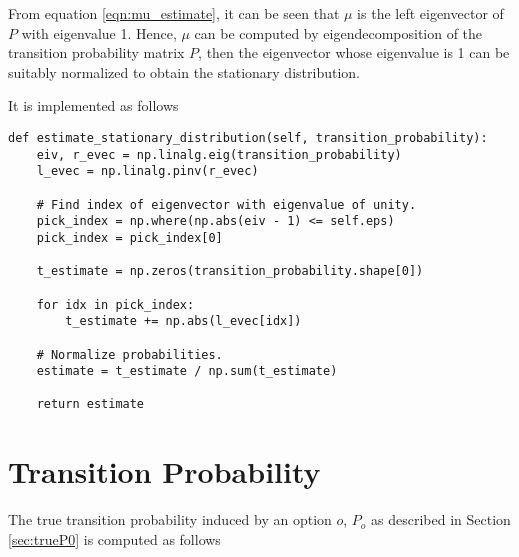 From equation \ref{eqn:mu_estimate}, it can be seen that $\mu$ is the left eigenvector of $P$ with eigenvalue 1.
Hence, $\mu$ can be computed by eigendecomposition of the transition probability matrix $P$, then the eigenvector whose eigenvalue is 1 can be suitably normalized to obtain the stationary distribution.

It is implemented as follows

\begin{verbatim}
def estimate_stationary_distribution(self, transition_probability):
    eiv, r_evec = np.linalg.eig(transition_probability)
    l_evec = np.linalg.pinv(r_evec)

    # Find index of eigenvector with eigenvalue of unity.
    pick_index = np.where(np.abs(eiv - 1) <= self.eps)
    pick_index = pick_index[0]

    t_estimate = np.zeros(transition_probability.shape[0])

    for idx in pick_index:
        t_estimate += np.abs(l_evec[idx])

    # Normalize probabilities.
    estimate = t_estimate / np.sum(t_estimate)

    return estimate
\end{verbatim}


\section{Transition Probability}

The true transition probability induced by an option $o$, $P_o$ as described in Section \ref{sec:trueP0} is computed as follows

